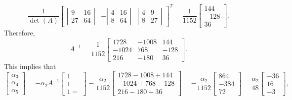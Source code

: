 \documentclass{homework}
\begin{document}
	\begin{equation}
	\frac{1}{\det(A)}\left[\begin{matrix}
		\left|\begin{matrix}
			9 & 16 \\ 27 & 64
		\end{matrix}\right| &
		-\left|\begin{matrix}
			4 & 16 \\ 8 & 64
		\end{matrix}\right| &
		\left|\begin{matrix}
			4 & 9 \\ 8 & 27
		\end{matrix}\right|
	\end{matrix}\right]^T = \frac{1}{1152} \left[\begin{matrix}
		144 \\ -128 \\ 36
	\end{matrix}\right].
	\end{equation}
	Therefore,
	\begin{equation}
		A^{-1} = \frac{1}{1152}\left[\begin{matrix}
			1728 & -1008 & 144 \\
			-1024 & 768 & -128 \\
			216 & -180 & 36
		\end{matrix}\right].
	\end{equation}
	This implies that
	\begin{equation}
		\left[\begin{matrix}
			\alpha_3 \\ \alpha_4 \\ \alpha_5
		\end{matrix}\right] =
		-\alpha_2A^{-1}\left[\begin{matrix}
			1\\1\\1 =
		\end{matrix}\right]
		-\frac{\alpha_2}{1152}\left[\begin{matrix}
			1728 - 1008 +144 \\ -1024 + 768 -128 \\ 216-180 + 36
		\end{matrix}\right] =-\frac{\alpha_2}{1152}\left[\begin{matrix}
			864 \\ -384 \\ 72
		\end{matrix}\right] = \frac{\alpha_2}{48}\left[\begin{matrix}
			-36 \\ 16 \\ -3
		\end{matrix}\right],
	\end{equation}
\end{document}
